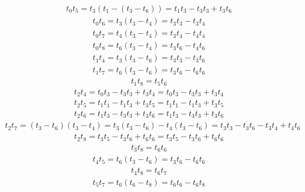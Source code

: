 \begin{align*}
    t_{0}t_{5} 
    = t_{3}(t_{1} - (t_{3} - t_{6})) 
    = t_{1}t_{3} - t_{3}t_{3} + t_{3}t_{6}
\end{align*}
\begin{align*}
    t_{0}t_{6}
    = t_{3}(t_{3} - t_{4})
    = t_{3}t_{3} - t_{3}t_{4}
\end{align*}
\begin{align*}
    t_{0}t_{7}
    = t_{4}(t_{3} - t_{4})
    = t_{3}t_{4} - t_{4}t_{4}
\end{align*}
\begin{align*}
    t_{0}t_{8}
    = t_{6}(t_{3} - t_{4})
    = t_{3}t_{6} - t_{4}t_{6}
\end{align*}
\begin{align*}
    t_{1}t_{4}
    = t_{3}(t_{3} - t_{6})
    = t_{3}t_{3} - t_{3}t_{6}
\end{align*}
\begin{align*}
    t_{1}t_{7} 
    = t_{6}(t_{3} - t_{6})
    = t_{3}t_{6} - t_{6}t_{6}
\end{align*}
\begin{align*}
    t_{1}t_{8} = t_{5}t_{6}
\end{align*}
\begin{align*}
    t_{2}t_{4} 
    = t_{0}t_{3} - t_{3}t_{3} + t_{3}t_{4}
    = t_{0}t_{3} - t_{3}t_{3} + t_{3}t_{4}
\end{align*}
\begin{align*}
    t_{2}t_{5}
    = t_{1}t_{1} - t_{1}t_{3} + t_{3}t_{5}
    = t_{1}t_{1} - t_{1}t_{3} + t_{3}t_{5}
\end{align*}
\begin{align*}
    t_{2}t_{6} 
    = t_{1}t_{3} - t_{3}t_{3} + t_{3}t_{6}
    = t_{1}t_{3} - t_{3}t_{3} + t_{3}t_{6}
\end{align*}
\begin{align*}
    t_{2}t_{7} 
    = (t_{3} - t_{6})(t_{3} - t_{4})
    = t_{3}(t_{3} - t_{6}) - t_{4}(t_{3} - t_{6})
    = t_{3}t_{3} - t_{3}t_{6} - t_{3}t_{4} + t_{4}t_{6}
\end{align*}
\begin{align*}
    t_{2}t_{8} 
    = t_{3}t_{5} - t_{3}t_{6} + t_{6}t_{6}
    = t_{3}t_{5} - t_{3}t_{6} + t_{6}t_{6}
\end{align*}
\begin{align*}
    t_{3}t_{8} = t_{6}t_{6}
\end{align*}
\begin{align*}
    t_{4}t_{5} 
    = t_{6}(t_{3} - t_{6})
    = t_{3}t_{6} - t_{6}t_{6}
\end{align*}
\begin{align*}t_{4}t_{8} = t_{6}t_{7}
\end{align*}
\begin{align*}
    t_{5}t_{7} 
    = t_{6}(t_{6} - t_{8})
    = t_{6}t_{6} - t_{6}t_{8}
\end{align*}


